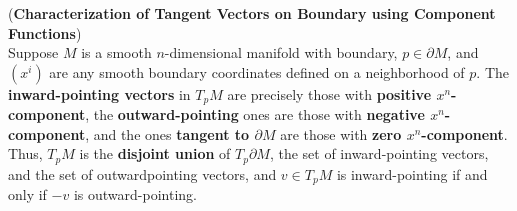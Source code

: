 \documentclass[11pt]{article}
\begin{document}
\begin{itemize}
\begin{remark}
 \begin{proposition} (\textbf{Characterization of Tangent Vectors on Boundary using Component Functions})\\
Suppose $M$ is a smooth $n$-dimensional manifold with boundary, $p \in \partial M$, and $(x^i)$ are any smooth boundary coordinates defined on a neighborhood of $p$. The \textbf{inward-pointing vectors} in $T_{p}M$ are precisely those with \textbf{positive $x^n$-component}, the \textbf{outward-pointing} ones are those with \textbf{negative $x^n$-component}, and the ones \textbf{tangent to $\partial M$} are those with \textbf{zero $x^n$-component}. Thus, $T_{p}M$ is the \textbf{disjoint union} of $T_{p}\partial M$, the set of inward-pointing vectors, and the set of outwardpointing vectors, and $v \in T_{p}M$ is inward-pointing if and only if $-v$ is outward-pointing.
\end{proposition}
\end{remark}
\end{itemize}
\end{document}
